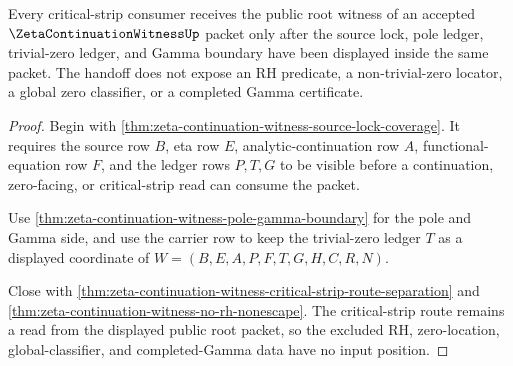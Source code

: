 \begin{theorem}
\label{thm:zeta-continuation-witness-critical-strip-root-handoff}
Every critical-strip consumer receives the public root witness of an accepted $\ZetaContinuationWitnessUp$ packet only after the source lock, pole ledger, trivial-zero ledger, and Gamma boundary have been displayed inside the same packet. The handoff does not expose an RH predicate, a non-trivial-zero locator, a global zero classifier, or a completed Gamma certificate.
\end{theorem}
\begin{proof}
Begin with \autoref{thm:zeta-continuation-witness-source-lock-coverage}. It requires the source row $B$, eta row $E$, analytic-continuation row $A$, functional-equation row $F$, and the ledger rows $P,T,G$ to be visible before a continuation, zero-facing, or critical-strip read can consume the packet.

Use \autoref{thm:zeta-continuation-witness-pole-gamma-boundary} for the pole and Gamma side, and use the carrier row to keep the trivial-zero ledger $T$ as a displayed coordinate of $W=(B,E,A,P,F,T,G,H,C,R,N)$.

Close with \autoref{thm:zeta-continuation-witness-critical-strip-route-separation} and \autoref{thm:zeta-continuation-witness-no-rh-nonescape}. The critical-strip route remains a read from the displayed public root packet, so the excluded RH, zero-location, global-classifier, and completed-Gamma data have no input position.
\end{proof}

